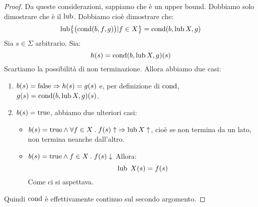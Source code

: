 \begin{proof}
Da queste considerazioni, sappiamo che è un upper bound.
Dobbiamo solo dimostrare che è il $\mathop{\mathrm{lub}}\nolimits$. Dobbiamo cioè dimostrare che:
\[
  \mathop{\mathrm{lub}}\nolimits \bigl\{ \bigl(\mathrm{cond}(b,f,g)\bigr) | f \in X \bigr\} = \mathrm{cond}(b, \mathop{\mathrm{lub}}\nolimits X, g)
\]
Sia $s \in \Sigma$ arbitrario. Sia:
\[ h(s) = \mathrm{cond}(b,\mathop{\mathrm{lub}}\nolimits X, g)(s) \]
Scartiamo la possibilità di non terminazione. Allora abbiamo due casi:
\begin{enumerate}
  \item $b(s) = \mathrm{false} \Rightarrow h(s) = g(s)$
    e, per definizione di $\mathrm{cond}$,
    $g(s) = \mathrm{cond}(b,\mathop{\mathrm{lub}}\nolimits X, g)(s) $.
  \item $b(s)=\mathrm{true}$, abbiamo due ulteriori casi:
    \begin{itemize}
      \item $b(s) = \mathrm{true} \land \forall f \in X \mathrel{.} f(s)
      \uparrow \; \Rightarrow \mathop{\mathrm{lub}}\nolimits X \uparrow$,
      cioè se non termina da un lato, non termina neanche dall'altro.
      \item $b(s)=\mathrm{true} \land f \in X \mathrel{.} f(s) \downarrow$
      Allora:
      \[ \mathop{\mathrm{lub}}\nolimits \; X(s) = f(s) \]
      Come ci si aspettava.
    \end{itemize}
\end{enumerate}
Quindi $\mathrm{cond}$ è effettivamente continuo sul secondo argomento.


\end{proof}
